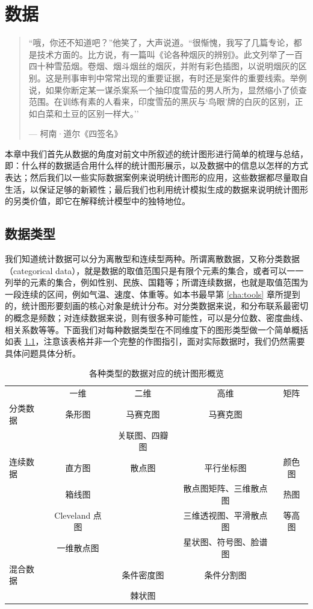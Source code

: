 \documentclass[
  b5paper,
  UTF8,twoside]{book}
\begin{document}
\hypertarget{chap:data}{%
\chapter{数据}\label{chap:data}}

\begin{quote}
``哦，你还不知道吧？''他笑了，大声说道。``很惭愧，我写了几篇专论，都是技术方面的。比方说，有一篇叫《论各种烟灰的辨别》。此文列举了一百四十种雪茄烟。卷烟、烟斗烟丝的烟灰，并附有彩色插图，以说明烟灰的区别。这是刑事审判中常常出现的重要证据，有时还是案件的重要线索。举例说，如果你断定某一谋杀案系一个抽印度雪茄的男人所为，显然缩小了侦查范围。在训练有素的人看来，印度雪茄的黑灰与`鸟眼'牌的白灰的区别，正如白菜和土豆的区别一样大。''

\hspace*{\fill} --- 柯南·道尔《四签名》
\end{quote}

本章中我们首先从数据的角度对前文中所叙述的统计图形进行简单的梳理与总结，即：什么样的数据适合用什么样的统计图形展示，以及数据中的信息以怎样的方式表达；然后我们以一些实际数据案例来说明统计图形的应用，这些数据都尽量取自生活，以保证足够的新颖性；最后我们也利用统计模拟生成的数据来说明统计图形的另类价值，即它在解释统计模型中的独特地位。

\hypertarget{sec:data-type}{%
\section{数据类型}\label{sec:data-type}}

我们知道统计数据可以分为离散型和连续型两种。所谓离散数据，又称分类数据（categorical data），就是数据的取值范围只是有限个元素的集合，或者可以一一列举的元素的集合，例如性别、民族、国籍等；所谓连续数据，也就是取值范围为一段连续的区间，例如气温、速度、体重等。如本书最早第 \ref{cha:tools} 章所提到的，统计图形要刻画的核心对象是统计分布。对分类数据来说，和分布联系最密切的概念是频数；对连续数据来说，则有很多种可能性，可以是分位数、密度曲线、相关系数等等。下面我们对每种数据类型在不同维度下的图形类型做一个简单概括如表 \ref{tab:plot-summary}，注意该表格并非一个完整的作图指引，面对实际数据时，我们仍然需要具体问题具体分析。

\begin{longtable}[]{@{}lcccc@{}}
\caption{\label{tab:plot-summary} 各种类型的数据对应的统计图形概览}\tabularnewline
\toprule()
\endhead
& 一维 & 二维 & 高维 & 矩阵 \\
分类数据 & 条形图 & 马赛克图 & 马赛克图 & \\
& & 关联图、四瓣图 & & \\
连续数据 & 直方图 & 散点图 & 平行坐标图 & 颜色图 \\
& 箱线图 & & 散点图矩阵、三维散点图 & 热图 \\
& Cleveland 点图 & & 三维透视图、平滑散点图 & 等高图 \\
& 一维散点图 & & 星状图、符号图、脸谱图 & \\
混合数据 & & 条件密度图 & 条件分割图 & \\
& & 棘状图 & & \\
\bottomrule()
\end{longtable}
\end{document}
